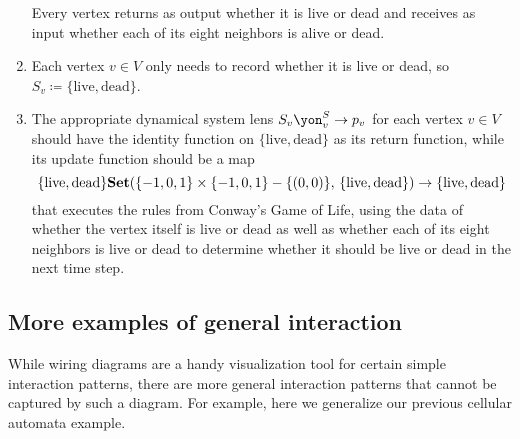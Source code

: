 \documentclass[Book-Poly]{subfiles}
\begin{document}
\begin{exercise}
\begin{solution}
\begin{enumerate}
\[    \]
    Every vertex returns as output whether it is live or dead and receives as input whether each of its eight neighbors is alive or dead.
    \item Each vertex $v\in V$ only needs to record whether it is live or dead, so $S_v\coloneqq\{\text{live},\text{dead}\}$.
    \item The appropriate dynamical system lens $S_v\yon^S_v\to p_v$ for each vertex $v\in V$ should have the identity function on $\{\text{live},\text{dead}\}$ as its return function, while its update function should be a map
    \[
        \{\text{live},\text{dead}\}\mathbf{Set}(\{-1,0,1\}\times\{-1,0,1\}-\{(0,0)\},\, \{\text{live},\text{dead}\})\to\{\text{live},\text{dead}\}
    \]
    that executes the rules from Conway's Game of Life, using the data of whether the vertex itself is live or dead as well as whether each of its eight neighbors is live or dead to determine whether it should be live or dead in the next time step.
\end{enumerate}
\end{solution}
\end{exercise}

\subsection{More examples of general interaction}

While wiring diagrams are a handy visualization tool for certain simple interaction patterns, there are more general interaction patterns that cannot be captured by such a diagram.
For example, here we generalize our previous cellular automata example.
\end{document}
